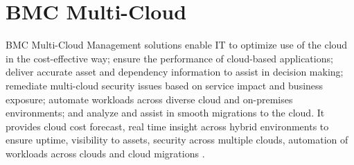 \section{BMC Multi-Cloud}
BMC Multi-Cloud Management solutions enable IT to optimize use of the
cloud in the cost-effective way; ensure the performance of cloud-based
applications; deliver accurate asset and dependency information to
assist in decision making; remediate multi-cloud security issues based
on service impact and business exposure; automate workloads across
diverse cloud and on-premises environments; and analyze and assist in
smooth migrations to the cloud. It provides cloud cost forecast, real
time insight across hybrid environments to ensure uptime, visibility
to assets, security across multiple clouds, automation of workloads
across clouds and cloud migrations \cite{hid-sp18-402-bmc}.

